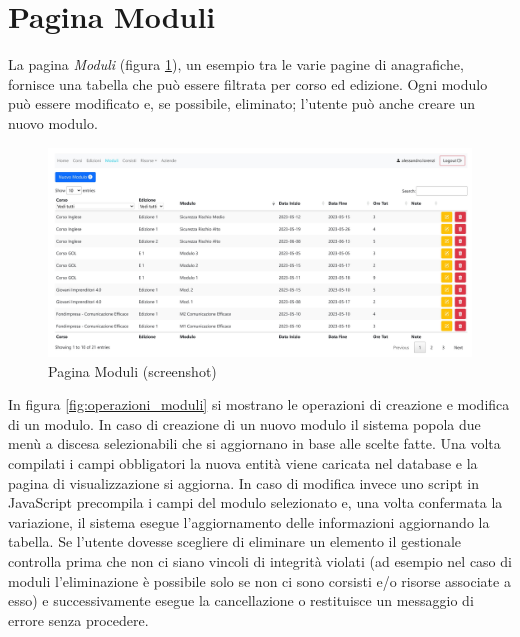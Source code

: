 \section{Pagina Moduli}
La pagina \textit{Moduli} (figura \ref{fig:moduli}), un esempio tra le varie pagine di anagrafiche, fornisce una tabella che può essere filtrata per corso ed edizione. Ogni modulo può essere modificato e, se possibile, eliminato; l'utente può anche creare un nuovo modulo. 
\begin{figure}[!hbt]
\centering
\includegraphics[scale=0.35]{img/screen/Moduli_tabella-1.jpg}
\caption{Pagina Moduli (screenshot)}
\label{fig:moduli}
\end{figure}
\newline
In figura \ref{fig:operazioni_moduli} si mostrano le operazioni di creazione e modifica di un modulo. In caso di creazione di un nuovo modulo il sistema popola due menù a discesa selezionabili che si aggiornano in base alle scelte fatte. Una volta compilati i campi obbligatori la nuova entità viene caricata nel database e la pagina di visualizzazione si aggiorna. In caso di modifica invece uno script in JavaScript precompila i campi del modulo selezionato e, una volta confermata la variazione, il sistema esegue l'aggiornamento delle informazioni aggiornando la tabella. Se l'utente dovesse scegliere di eliminare un elemento il gestionale controlla prima che non ci siano vincoli di integrità violati (ad esempio nel caso di moduli l'eliminazione è possibile solo se non ci sono corsisti e/o risorse associate a esso) e successivamente esegue la cancellazione o restituisce un messaggio di errore senza procedere.
